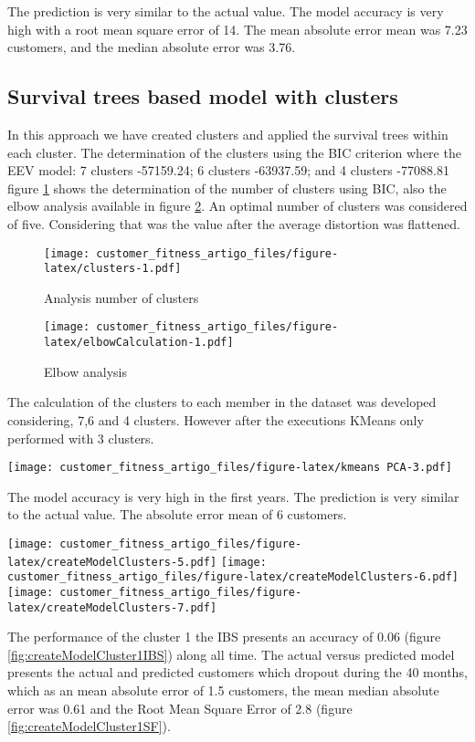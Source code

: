 \documentclass[
  12pt,
]{article}
\begin{document}
The prediction is very similar to the actual value.
The model accuracy is very high with a root mean square error of
14.
The mean absolute error mean was 7.23 customers,
and the median absolute error was 3.76.

\hypertarget{survival-trees-based-model-with-clusters}{%
\subsection{Survival trees based model with clusters}\label{survival-trees-based-model-with-clusters}}

In this approach we have created clusters and applied the survival trees within
each cluster.
The determination of the clusters using the BIC criterion where the EEV model: 7 clusters -57159.24;
6 clusters -63937.59; and 4 clusters -77088.81 figure \ref{fig:clusters} shows the
determination of the number of clusters using BIC, also the elbow analysis available in
figure \ref{fig:elbowCalculation}.
An optimal number of clusters was considered of five.
Considering that was the value after the average distortion was flattened.

\begin{figure}
\centering
\texttt{[image: customer\_fitness\_artigo\_files/figure-latex/clusters-1.pdf]}
\caption{\label{fig:clusters}Analysis number of clusters}
\end{figure}

\begin{figure}
\centering
\texttt{[image: customer\_fitness\_artigo\_files/figure-latex/elbowCalculation-1.pdf]}
\caption{\label{fig:elbowCalculation}Elbow analysis}
\end{figure}

The calculation of the clusters to each member in the dataset was developed considering,
7,6 and 4 clusters.
However after the executions KMeans only performed with 3 clusters.

\texttt{[image: customer\_fitness\_artigo\_files/figure-latex/kmeans PCA-3.pdf]}

The model accuracy is very high in the first years. The prediction is very
similar to the actual value. The absolute error mean of
6 customers.

\texttt{[image: customer\_fitness\_artigo\_files/figure-latex/createModelClusters-5.pdf]} \texttt{[image: customer\_fitness\_artigo\_files/figure-latex/createModelClusters-6.pdf]} \texttt{[image: customer\_fitness\_artigo\_files/figure-latex/createModelClusters-7.pdf]}

The performance of the cluster 1 the IBS presents an accuracy of 0.06
(figure \ref{fig:createModelCluster1IBS}) along all time.
The actual versus predicted model presents the actual and predicted customers which dropout during
the 40 months, which as an mean absolute error of 1.5 customers, the mean median absolute
error was 0.61 and the Root Mean Square Error of 2.8 (figure \ref{fig:createModelCluster1SF}).
\end{document}
